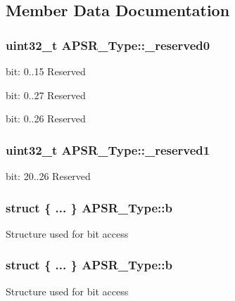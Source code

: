 \subsection{Member Data Documentation}
\subsubsection[{\texorpdfstring{\+\_\+reserved0}{_reserved0}}]{\setlength{\rightskip}{0pt plus 5cm}uint32\+\_\+t A\+P\+S\+R\+\_\+\+Type\+::\+\_\+reserved0}\hypertarget{unionAPSR__Type_afbce95646fd514c10aa85ec0a33db728}{}\label{unionAPSR__Type_afbce95646fd514c10aa85ec0a33db728}
bit\+: 0..15 Reserved

bit\+: 0..27 Reserved

bit\+: 0..26 Reserved 
\subsubsection[{\texorpdfstring{\+\_\+reserved1}{_reserved1}}]{\setlength{\rightskip}{0pt plus 5cm}uint32\+\_\+t A\+P\+S\+R\+\_\+\+Type\+::\+\_\+reserved1}\hypertarget{unionAPSR__Type_ac681f266e20b3b3591b961e13633ae13}{}\label{unionAPSR__Type_ac681f266e20b3b3591b961e13633ae13}
bit\+: 20..26 Reserved 
\subsubsection[{\texorpdfstring{b}{b}}]{\setlength{\rightskip}{0pt plus 5cm}struct \{ ... \}   A\+P\+S\+R\+\_\+\+Type\+::b}\hypertarget{unionAPSR__Type_a58bbe4a401dd92b53a0e9e2ab20486a9}{}\label{unionAPSR__Type_a58bbe4a401dd92b53a0e9e2ab20486a9}
Structure used for bit access 
\subsubsection[{\texorpdfstring{b}{b}}]{\setlength{\rightskip}{0pt plus 5cm}struct \{ ... \}   A\+P\+S\+R\+\_\+\+Type\+::b}\hypertarget{unionAPSR__Type_a9d6e85a85f395a3b51e915420fe081de}{}\label{unionAPSR__Type_a9d6e85a85f395a3b51e915420fe081de}
Structure used for bit access 
